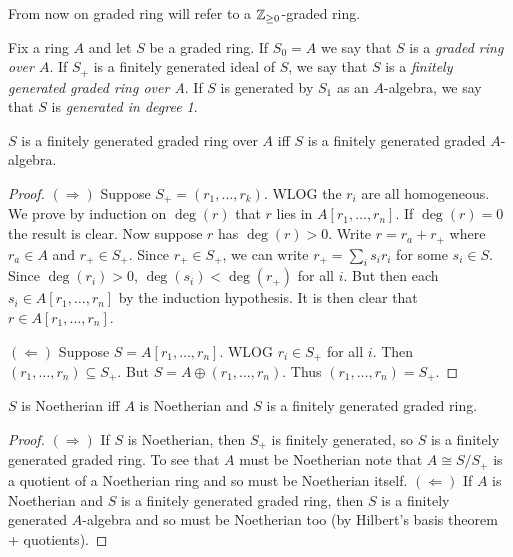 \documentclass{memoir}
\begin{document}
\begin{remark}
    From now on graded ring will refer to a $\mathbb{Z}_{\ge 0}$-graded ring.
\end{remark}
\begin{definition}
    Fix a ring $A$ and let $S$ be a graded ring.
    If $S_0 = A$ we say that $S$ is a \textit{graded ring over $A$}.
    If $S_+$ is a finitely generated ideal of $S$, we say that $S$ is a \textit{finitely generated graded ring over A}.
    If $S$ is generated by $S_1$ as an $A$-algebra, we say that $S$ is \textit{generated in degree 1}.
\end{definition}
\begin{proposition}
    $S$ is a finitely generated graded ring over $A$ iff $S$ is a finitely generated graded $A$-algebra.
\end{proposition}
\begin{proof}
    $(\Rightarrow)$ Suppose $S_+ = (r_1,\dots,r_k)$.
    WLOG the $r_i$ are all homogeneous.
    We prove by induction on $\deg(r)$ that $r$ lies in $A[r_1,\dots,r_n]$.
    If $\deg(r) = 0$ the result is clear.
    Now suppose $r$ has $\deg(r)>0$.
    Write $r = r_a+r_+$ where $r_a\in A$ and $r_+\in S_+$.
    Since $r_+\in S_+$, we can write $r_+ = \sum_is_ir_i$ for some $s_i\in S$.
    Since $\deg(r_i)>0$, $\deg(s_i)<\deg(r_+)$ for all $i$.
    But then each $s_i\in A[r_1,\dots,r_n]$ by the induction hypothesis.
    It is then clear that $r\in A[r_1,\dots,r_n]$.

    $(\Leftarrow)$ Suppose $S = A[r_1,\dots,r_n]$.
    WLOG $r_i\in S_+$ for all $i$.
    Then $(r_1,\dots,r_n)\subseteq S_+$.
    But $S = A \oplus (r_1,\dots,r_n)$.
    Thus $(r_1,\dots,r_n)=S_+$.
\end{proof}
\begin{corollary}
    $S$ is Noetherian iff $A$ is Noetherian and $S$ is a finitely generated graded ring.
\end{corollary}
\begin{proof}
    $(\Rightarrow)$ If $S$ is Noetherian, then $S_+$ is finitely generated, so $S$ is a finitely generated graded ring.
    To see that $A$ must be Noetherian note that $A \cong S/S_+$ is a quotient of a Noetherian ring and so must be Noetherian itself.
    $(\Leftarrow)$ If $A$ is Noetherian and $S$ is a finitely generated graded ring, then $S$ is a finitely generated $A$-algebra and so must be Noetherian too (by Hilbert's basis theorem + quotients).
\end{proof}
\end{document}
